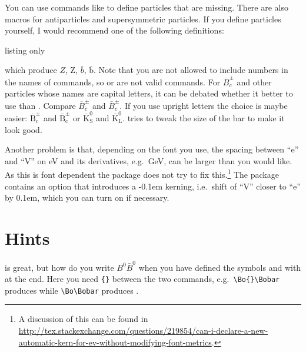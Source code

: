 You can use commands like  to define particles that are missing.
There are also macros for antiparticles and supersymmetric particles.
If you define particles yourself,
I would recommend one of the following definitions:
\begin{tcblisting}{listing only}
\newcommand*{\Zo}{\ensuremath{Z}\xspace}
\newcommand*{\Zo}{\ensuremath{\text{Z}}\xspace}
\newcommand*{\bbarQ}{\ensuremath{\bar{b}}\xspace}
\newcommand*{\bbarQ}{\ensuremath{\bar{\text{b}}}\xspace}
\end{tcblisting}
\noindent
which produce \ensuremath{Z}, \ensuremath{\text{Z}},
\ensuremath{\bar{b}}, \ensuremath{\bar{\text{b}}}. Note that you are
not allowed to include numbers in the names of commands, so
 or  are not valid commands.
For \(\overline{B}^{\pm}_{c}\) and other particles whose names are capital
letters, it can be debated whether it better to use
 than .
Compare \(\overline{B}^{\pm}_{c}\) and \(\bar{B}^{\pm}_{c}\).
If you use upright letters the choice is maybe
easier: \(\overline{\text{B}}^{\pm}_{\text{c}}\) and
\(\bar{\text{B}}^{\pm}_{\text{c}}\) or
\(\overline{\text{K}}^{0}_{\text{S}}\) and
\(\bar{\text{K}}^{0}_{\text{L}}\).
 tries to tweak the size of the bar to make it look good.

Another problem is that, depending on the font you use, the spacing between \enquote{e} and \enquote{V}
on \si{\eV} and its derivatives, e.g.\ \si{\GeV}, can be larger than you would like.
As this is font dependent the  package does not try to fix this.\footnote{%
A discussion of this can be found in
\url{http://tex.stackexchange.com/questions/219854/can-i-declare-a-new-automatic-kern-for-ev-without-modifying-font-metrics}.}
The  package contains an option  that introduces a -0.1em kerning,
i.e.\ shift of \enquote{V} closer to \enquote{e} by 0.1em, which you can turn on if necessary.


\section{Hints}%
\label{sec:tips:hints}

 is great, but how do you write \(B^{0}\bar{B}^{0}\) when
you have defined the symbols  and  with
 at the end. Here you need \verb+{}+ between the two
commands, e.g.\ \verb+\Bo{}\Bobar+ produces \Bo{}\Bobar while
\verb+\Bo\Bobar+ produces \Bo\Bobar.

